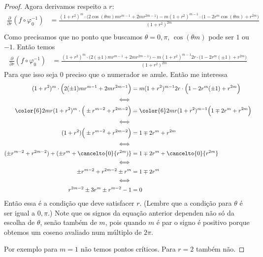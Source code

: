 \begin{proof}
Agora derivamos respeito a \(r\):
\begin{align*}
\frac{\partial }{\partial r}(f \circ \varphi_0^{-1})&=\frac{(1+r^2)^m\cdot \Big(2\cos (\theta m)m r^{m-1}+2mr^{2m-1})-m(1+r^2)^{m-1}\cdot \Big(1-2r^m \cos (\theta m)+r^{2m}\Big)}{(1+r^2)^{2m}}\\
\end{align*}
Como precisamos que no ponto que buscamos \(\theta =0,\pi\), \(\cos (\theta m)\) pode ser \(1\) ou \(-1\). Então temos
\begin{align*}
\frac{\partial }{\partial r}(f \circ \varphi_0^{-1})&=\frac{(1+r^2)^m\cdot \Big(2(\pm 1)m r^{m-1}+2mr^{2m-1}\Big)-m(1+r^2)^{m-1}2r\cdot \Big(1-2r^m (\pm 1)+r^{2m}\Big)}{(1+r^2)^{2m}}
\end{align*}
Para que isso seja \(0\) preciso que o numerador se anule. Então me interessa
\begin{align*}
(1+r^2)^m\cdot \Big(2(\pm 1)m r^{m-1}+2mr^{2m-1}\Big)&=m(1+r^2)^{m-1}2r\cdot \Big(1-2r^m (\pm 1)+r^{2m}\Big)\\
\iff\\
{\color{6}2mr}(1+r^2)^m\cdot \Big(\pm r^{m-2}+r^{2m-2}\Big)&={\color{6}2mr}(1+r^2)^{m-1}\Big(1\mp 2r^m+r^{2m}\Big)\\
\iff\\
(1+r^2)\Big(\pm r^{m-2}+r^{2m-2}\Big)&=1\mp 2r^m+r^{2m}\\
\iff\\
(\pm r^{m-2}+r^{2m-2})+(\pm r^{m}+\cancelto{0}{r^{2m})}&=1\mp 2r^m+\cancelto{0}{r^{2m}}\\\iff\\
\pm r^{m-2}+r^{2m-2}\pm r^{m}&=1\mp 2r^m\\
\iff \\
r^{2m-2}\pm 3r^m \pm r^{m-2}-1&=0
\end{align*}
Então essa é a condição que deve satisfacer \(r\). (Lembre que a condição para \(\theta\) é ser igual a \(0,\pi\).) Note que os signos da equação anterior dependen não só da escolha de \(\theta\), senão também de \(m\), pois quando \(m\) é par o signo é positivo porque obtemos um coseno avaliado num múltiplo de \(2\pi\).

Por exemplo para \(m=1\) não temos pontos críticos. Para \(r=2\) também não.
\end{proof}

